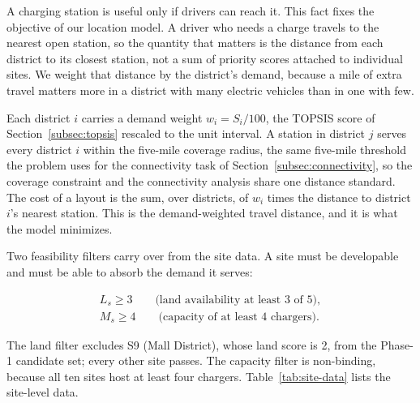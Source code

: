 \documentclass[12pt]{article}
\begin{document}
A charging station is useful only if drivers can reach it. This fact fixes the
objective of our location model. A driver who needs a charge travels to the
nearest open station, so the quantity that matters is the distance from each
district to its closest station, not a sum of priority scores attached to
individual sites. We weight that distance by the district's demand, because a
mile of extra travel matters more in a district with many electric vehicles
than in one with few.

Each district $i$ carries a demand weight $w_i = S_i / 100$, the TOPSIS score
of Section~\ref{subsec:topsis} rescaled to the unit interval. A station in
district $j$ serves every district $i$ within the five-mile coverage radius,
the same five-mile threshold the problem uses for the connectivity task of
Section~\ref{subsec:connectivity}, so the coverage constraint and the
connectivity analysis share one distance standard. The cost of a layout is the
sum, over districts, of $w_i$ times the distance to district $i$'s nearest
station. This is the demand-weighted travel distance, and it is what the model
minimizes.

Two feasibility filters carry over from the site data. A site must be
developable and must be able to absorb the demand it serves:

\begin{gather}
L_s \ge 3 \qquad \text{(land availability at least 3 of 5)}, \label{eq:land-filter} \\[4pt]
M_s \ge 4 \qquad \text{(capacity of at least 4 chargers)}. \label{eq:cap-filter}
\end{gather}

The land filter excludes S9 (Mall District), whose land score is 2, from the
Phase-1 candidate set; every other site passes. The capacity filter is
non-binding, because all ten sites host at least four chargers.
Table~\ref{tab:site-data} lists the site-level data.
\end{document}
